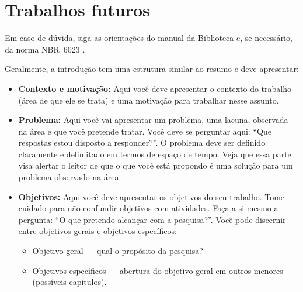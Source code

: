 \documentclass[english,brazilian]{UNISINOSmonografia}
\begin{document}
	\section{Trabalhos futuros}

Em caso de dúvida, siga as orientações do manual da Biblioteca \cite{Biblioteca11} e, se necessário, da norma NBR~6023 \cite{NBR6023:2002}.


























































Geralmente, a introdução tem uma estrutura similar ao resumo e deve apresentar:
\begin{itemize}
	\item \textbf{Contexto e motivação:} Aqui você deve apresentar o contexto do trabalho (área de que ele se trata) e uma motivação para trabalhar nesse assunto.
	\item \textbf{Problema:} Aqui você vai apresentar um problema, uma lacuna, observada na área e que você pretende tratar. Você deve se perguntar aqui: ``Que respostas estou disposto a responder?''. O problema deve ser definido claramente e delimitado em termos de espaço de tempo. Veja que essa parte visa alertar o leitor de que o que você está propondo é uma solução para um problema observado na área. 
	

	\item \textbf{Objetivos:} Aqui você deve apresentar os objetivos do seu trabalho. Tome cuidado para não confundir objetivos com atividades.   Faça a si mesmo a pergunta: ``O que pretendo alcançar com a pesquisa?''. Você pode discernir entre objetivos gerais e objetivos específicos:
	\begin{itemize}
		\item Objetivo geral --- qual o propósito da pesquisa?
		\item Objetivos específicos --- abertura do objetivo geral em outros menores (possíveis capítulos).
	\end{itemize}
	
\end{itemize}


\end{document}
